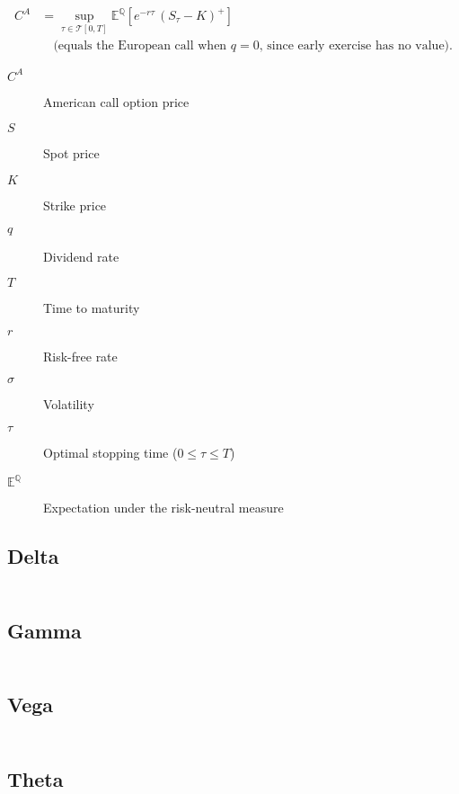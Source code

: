 \documentclass[12pt,a4paper]{article}
\begin{document}
\[
  \begin{aligned}
    C^{A} & = \sup_{\tau \in \mathcal{T}[0,T]} \mathbb{E}^{\mathbb{Q}}\!\left[ e^{-r \tau}\,(S_{\tau}-K)^{+} \right] \\[4pt]
          & \quad \text{(equals the European call when $q=0$, since early exercise has no value).}
  \end{aligned}
\]

\begin{description}
  \item[$C^{A}$] American call option price
  \item[$S$] Spot price
  \item[$K$] Strike price
  \item[$q$] Dividend rate
  \item[$T$] Time to maturity
  \item[$r$] Risk-free rate
  \item[$\sigma$] Volatility
  \item[$\tau$] Optimal stopping time (\( 0 \le \tau \le T \))
  \item[$\mathbb{E}^{\mathbb{Q}}$] Expectation under the risk-neutral measure
\end{description}

\subsection{Delta}
\[
  \begin{aligned}
  \end{aligned}
\]

\subsection{Gamma}
\[
  \begin{aligned}
  \end{aligned}
\]

\subsection{Vega}
\[
  \begin{aligned}
  \end{aligned}
\]

\subsection{Theta}
\[
  \begin{aligned}
  \end{aligned}
\]
\end{document}
